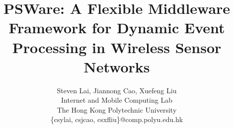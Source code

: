 \title{PSWare: A Flexible Middleware Framework for Dynamic Event Processing in Wireless Sensor Networks}
\author{Steven Lai, Jiannong Cao, Xuefeng Liu
	\\Internet and Mobile Computing Lab
	\\ The Hong Kong Polytechnic University
	\\ \{csylai, csjcao, csxfliu\}@comp.polyu.edu.hk
}
\maketitle